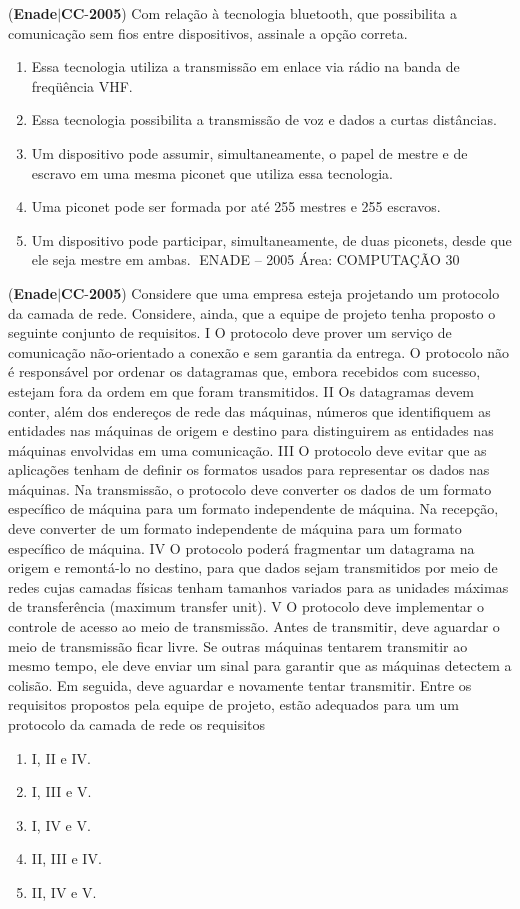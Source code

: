 \documentclass{exam}
\begin{document}
\begin{questions}
\question (\textbf{Enade}$|$\textbf{CC}-\textbf{2005}) Com relação à tecnologia bluetooth, que possibilita a
comunicação sem fios entre dispositivos, assinale a opção
correta.
	\begin{enumerate}[label=\alph*)]
		\item  Essa tecnologia utiliza a transmissão em enlace via rádio na
banda de freqüência VHF.
		\item  Essa tecnologia possibilita a transmissão de voz e dados a
curtas distâncias.
		\item  Um dispositivo pode assumir, simultaneamente, o papel de
mestre e de escravo em uma mesma piconet que utiliza essa
tecnologia.
		\item  Uma piconet pode ser formada por até 255 mestres e
255 escravos.
		\item  Um dispositivo pode participar, simultaneamente, de duas
piconets, desde que ele seja mestre em ambas.
ENADE – 2005 Área: COMPUTAÇÃO 30

	\end{enumerate}

\question (\textbf{Enade}$|$\textbf{CC}-\textbf{2005}) Considere que uma empresa esteja projetando um protocolo da camada de rede. Considere, ainda, que a equipe de projeto tenha
proposto o seguinte conjunto de requisitos.
I O protocolo deve prover um serviço de comunicação não-orientado a conexão e sem garantia da entrega. O protocolo não é
responsável por ordenar os datagramas que, embora recebidos com sucesso, estejam fora da ordem em que foram transmitidos.
II Os datagramas devem conter, além dos endereços de rede das máquinas, números que identifiquem as entidades nas máquinas de
origem e destino para distinguirem as entidades nas máquinas envolvidas em uma comunicação.
III O protocolo deve evitar que as aplicações tenham de definir os formatos usados para representar os dados nas máquinas. Na
transmissão, o protocolo deve converter os dados de um formato específico de máquina para um formato independente de máquina.
Na recepção, deve converter de um formato independente de máquina para um formato específico de máquina.
IV O protocolo poderá fragmentar um datagrama na origem e remontá-lo no destino, para que dados sejam transmitidos por meio de
redes cujas camadas físicas tenham tamanhos variados para as unidades máximas de transferência (maximum transfer unit).
V O protocolo deve implementar o controle de acesso ao meio de transmissão. Antes de transmitir, deve aguardar o meio de
transmissão ficar livre. Se outras máquinas tentarem transmitir ao mesmo tempo, ele deve enviar um sinal para garantir que as
máquinas detectem a colisão. Em seguida, deve aguardar e novamente tentar transmitir.
Entre os requisitos propostos pela equipe de projeto, estão adequados para um um protocolo da camada de rede os requisitos
	\begin{enumerate}[label=\alph*)]
		\item  I, II e IV. 
		\item  I, III e V. 
		\item  I, IV e V. 
		\item  II, III e IV. 
		\item  II, IV e V.


\end{enumerate}
\end{questions}
\end{document}
